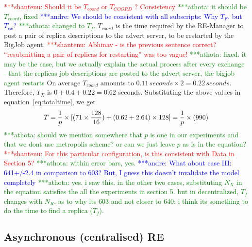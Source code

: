 \documentclass{rspublic}
\newcommand{\jhanote}[1]{ {\textcolor{red} { ***shantenu: #1 }}}
\newcommand{\alnote}[1]{ {\textcolor{blue} { ***andre: #1 }}}
\newcommand{\athotanote}[1]{ {\textcolor{green} { ***athota: #1 }}}
\newcommand{\alnote}[1]{}
\newcommand{\athotanote}[1]{}
\newcommand{\jhanote}[1]{}
\begin{document}
\jhanote{Should it be $T_{coord}$ or $T_{COORD}$ ? Consistency} \athotanote{it should be $T_{coord}$, fixed} \alnote{We should be consistent with all subscripts: Why $T_F$, but $T_{ex}$?} \athotanote{changed to $T_f$.}
$T_{coord}$ is the time required by the RE-Manager to post a pair 
of replica descriptions to the advert server, to be restarted by the BigJob agent. \jhanote{Abhinav - is the previous sentence correct?
  ``resubmitting a pair of replicas for restarting'' was too vague!} \athotanote{fixed. it may be the case, but we actually explain the actual process after every exchange - that the replicas job descriptions are posted to the advert server, the bigjob agent restarts}
On average $T_{coord}$ amounts to $0.11\,seconds \times 2 =
0.22\,seconds$. Therefore, $T_{X}$ is $0+0.4+0.22=0.62$ seconds.
Substituting the above values in equation~\ref{eq:totaltime}, we get
\begin{eqnarray}
  T=  {1 \over p} \times {[ {(71\times {128\over 16}})+ (0.62 + 2.64)\times 128]} = {1 \over p} \times (990)
\label{eq:sync}
\end{eqnarray}
\athotanote{should we mention somewhere that $p$ is one in our experiments and that we dont use metropolis scheme? or can we just leave $p$ as is in the equation?}
\jhanote{For this particular configuration, is this consistent with
  Data in Section 5?} \athotanote{within error bars, yes.} 
  \alnote{What about case III: 641+/-2.4 in comparison to 603? But, I guess this doesn't invalidate the model completely}
  \athotanote{yes. i saw this. in the other two cases, substituting $N_X$ in the equation satisfies the all the experiments in section 5. but in decentralized, $T_f$ changes with $N_R$. as to why its 603 and not closer to 640: i think its something to do the time to find a replica ($T_f$).}

\subsection{Asynchronous (centralised) RE}


\end{document}
